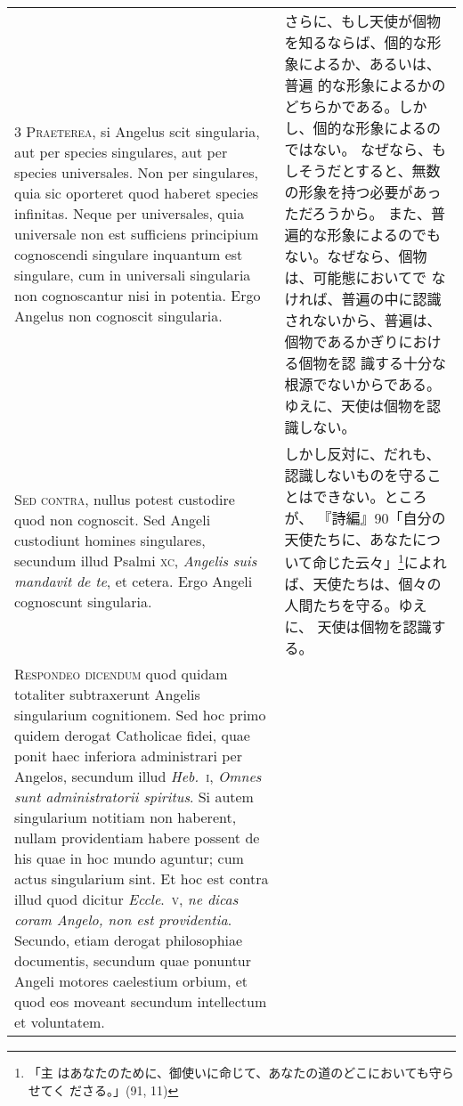 \documentclass[10pt]{jsarticle} %
\begin{document}
\begin{longtable}{p{21em}p{21em}}
{\scshape 3 Praeterea}, si Angelus scit singularia, aut
per species singulares, aut per species universales. Non per singulares,
quia sic oporteret quod haberet species infinitas. Neque per
universales, quia universale non est sufficiens principium cognoscendi
singulare inquantum est singulare, cum in universali singularia non
cognoscantur nisi in potentia. Ergo Angelus non cognoscit singularia.


&

 さらに、もし天使が個物を知るならば、個的な形象によるか、あるいは、普遍
 的な形象によるかのどちらかである。しかし、個的な形象によるのではない。
 なぜなら、もしそうだとすると、無数の形象を持つ必要があっただろうから。
 また、普遍的な形象によるのでもない。なぜなら、個物は、可能態においてで
 なければ、普遍の中に認識されないから、普遍は、個物であるかぎりにおける個物を認
 識する十分な根源でないからである。ゆえに、天使は個物を認識しない。

\\


{\scshape  Sed contra}, nullus potest custodire quod non
cognoscit. Sed Angeli custodiunt homines singulares, secundum illud
Psalmi {\scshape xc}, {\itshape Angelis suis mandavit de te}, et cetera. Ergo Angeli
cognoscunt singularia.


&


 しかし反対に、だれも、認識しないものを守ることはできない。ところが、
 『詩編』90「自分の天使たちに、あなたについて命じた云々」\footnote{「主
 はあなたのために、御使いに命じて、あなたの道のどこにおいても守らせてく
 ださる。」(91, 11)}によれば、天使たちは、個々の人間たちを守る。ゆえに、
 天使は個物を認識する。

\\


{\scshape Respondeo dicendum} quod quidam totaliter
subtraxerunt Angelis singularium cognitionem. Sed hoc primo quidem
derogat Catholicae fidei, quae ponit haec inferiora administrari per
Angelos, secundum illud {\itshape Heb.}~{\scshape i}, {\itshape Omnes sunt administratorii spiritus}. Si
autem singularium notitiam non haberent, nullam providentiam habere
possent de his quae in hoc mundo aguntur; cum actus singularium sint. Et
hoc est contra illud quod dicitur {\itshape Eccle}.~{\scshape v}, {\itshape ne dicas coram Angelo, non
est providentia}. Secundo, etiam derogat philosophiae documentis,
secundum quae ponuntur Angeli motores caelestium orbium, et quod eos
moveant secundum intellectum et voluntatem. 


&


\end{longtable}
\end{document}
